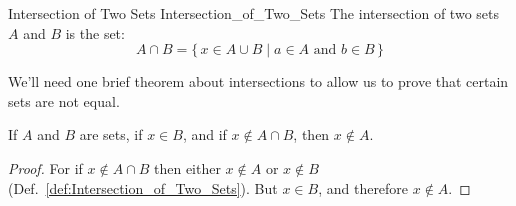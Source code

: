         \begin{fdefinition}{Intersection of Two Sets}
                           {Intersection_of_Two_Sets}
            The \gls{intersection of two sets} $A$ and $B$ is the set:
            \begin{equation*}
                A\cap{B}
                =\big\{\,x\in{A}\cup{B}\;|\;
                    a\in{A}\textrm{ and }b\in{B}\,\big\}
            \end{equation*}
        \end{fdefinition}
        We'll need one brief theorem about intersections to allow us to prove
        that certain sets are not equal.
        \begin{theorem}
            \label{thm:Lemma_for_Anti_Russells_Paradox}%
            If $A$ and $B$ are sets, if $x\in{B}$, and if $x\notin{A}\cap{B}$,
            then $x\notin{A}$.
        \end{theorem}
        \begin{proof}
            For if $x\notin{A}\cap{B}$ then either $x\notin{A}$ or $x\notin{B}$
            (Def.~\ref{def:Intersection_of_Two_Sets}). But $x\in{B}$, and
            therefore $x\notin{A}$.
        \end{proof}
